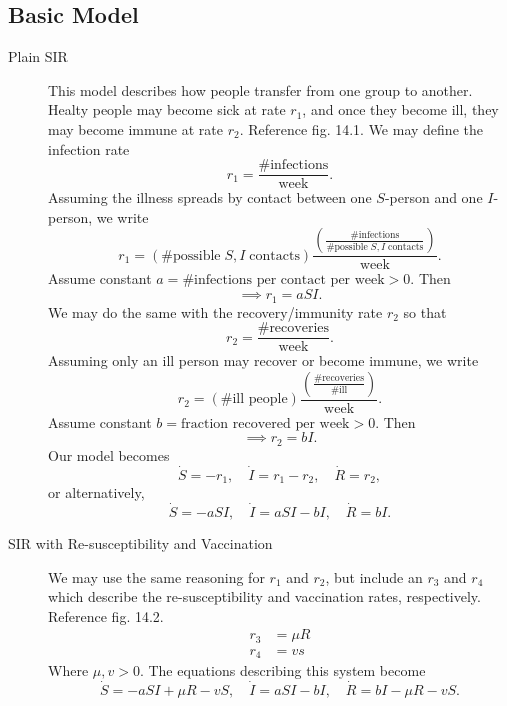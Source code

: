 \documentclass[12pt]{article}
\begin{document}
\subsection{Basic Model}
\begin{description}
\item [Plain SIR] This model describes how people transfer from one group to
  another. Healty people may become sick at rate $r_1$, and once they become
  ill, they may become immune at rate $r_2$. Reference fig. 14.1. We may define
  the infection rate
  \begin{equation*}
    r_1 = \frac{\text{\# infections}}{\text{week}}.
  \end{equation*}
  Assuming the illness spreads by contact between one $S$-person and one
  $I$-person, we write
  \begin{equation*}
    r_1=(\text{\# possible}\;S, I\;\text{contacts})\frac{{\left( \frac{\text{\# infections}}{\text{\# possible}\;S, I\;\text{contacts}} \right)}}{\text{week}}.
  \end{equation*}
  Assume constant $a=\text{\# infections per contact per week}>0$.
  Then
  \begin{equation*}
    \implies r_1 = aSI.
  \end{equation*}
  We may do the same with the recovery/immunity rate $r_2$ so that
  \begin{equation*}
    r_2 = \frac{\text{\# recoveries}}{\text{week}}.
  \end{equation*}
  Assuming only an ill person may recover or become immune, we write
  \begin{equation*}
    r_2 = (\text{\# ill people})\frac{\left( \frac{\text{\# recoveries}}{\text{\# ill}} \right)}{\text{week}}.
  \end{equation*}
  Assume constant $b=\text{fraction recovered per week}>0$. Then
  \begin{equation*}
    \implies r_2 = bI.
  \end{equation*}
  Our model becomes
  \begin{equation*}
    \dot{S}=-r_1,\quad \dot{I}=r_1-r_2,\quad\dot{R}=r_2,
  \end{equation*}
  or alternatively,
  \begin{equation*}
    \dot{S}=-aSI,\quad\dot{I}=aSI-bI,\quad\dot{R}=bI.
  \end{equation*}
\item [SIR with Re-susceptibility and Vaccination] We may use the same reasoning
  for $r_1$ and $r_2$, but include an $r_3$ and $r_4$ which describe the
  re-susceptibility and vaccination rates, respectively. Reference fig. 14.2.
  \begin{equation*}
    \begin{aligned}
      r_3 &= \mu R \\
      r_4 &= vs
    \end{aligned}
  \end{equation*}
  Where $\mu,v>0$. The equations describing this system become
  \begin{equation*}
    \dot{S}=-aSI+\mu R-vS,\quad\dot{I}=aSI-bI,\quad\dot{R}=bI-\mu R-vS.
  \end{equation*}
\end{description}
\end{document}

